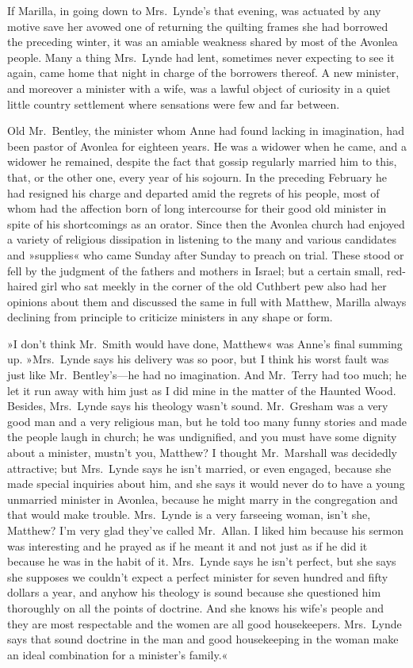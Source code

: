 If Marilla, in going down to Mrs.~Lynde's that evening, was actuated by any motive save her avowed one of returning the quilting frames she had borrowed the preceding winter, it was an amiable weakness shared by most of the Avonlea people. Many a thing Mrs.~Lynde had lent, sometimes never expecting to see it again, came home that night in charge of the borrowers thereof. A new minister, and moreover a minister with a wife, was a lawful object of curiosity in a quiet little country settlement where sensations were few and far between.

Old Mr.~Bentley, the minister whom Anne had found lacking in imagination, had been pastor of Avonlea for eighteen years. He was a widower when he came, and a widower he remained, despite the fact that gossip regularly married him to this, that, or the other one, every year of his sojourn. In the preceding February he had resigned his charge and departed amid the regrets of his people, most of whom had the affection born of long intercourse for their good old minister in spite of his shortcomings as an orator. Since then the Avonlea church had enjoyed a variety of religious dissipation in listening to the many and various candidates and »supplies« who came Sunday after Sunday to preach on trial. These stood or fell by the judgment of the fathers and mothers in Israel; but a certain small, red-haired girl who sat meekly in the corner of the old Cuthbert pew also had her opinions about them and discussed the same in full with Matthew, Marilla always declining from principle to criticize ministers in any shape or form.

»I don't think Mr.~Smith would have done, Matthew« was Anne's final summing up. »Mrs.~Lynde says his delivery was so poor, but I think his worst fault was just like Mr.~Bentley's—he had no imagination. And Mr.~Terry had too much; he let it run away with him just as I did mine in the matter of the Haunted Wood. Besides, Mrs.~Lynde says his theology wasn't sound. Mr.~Gresham was a very good man and a very religious man, but he told too many funny stories and made the people laugh in church; he was undignified, and you must have some dignity about a minister, mustn't you, Matthew? I thought Mr.~Marshall was decidedly attractive; but Mrs.~Lynde says he isn't married, or even engaged, because she made special inquiries about him, and she says it would never do to have a young unmarried minister in Avonlea, because he might marry in the congregation and that would make trouble. Mrs.~Lynde is a very farseeing woman, isn't she, Matthew? I'm very glad they've called Mr.~Allan. I liked him because his sermon was interesting and he prayed as if he meant it and not just as if he did it because he was in the habit of it. Mrs.~Lynde says he isn't perfect, but she says she supposes we couldn't expect a perfect minister for seven hundred and fifty dollars a year, and anyhow his theology is sound because she questioned him thoroughly on all the points of doctrine. And she knows his wife's people and they are most respectable and the women are all good housekeepers. Mrs.~Lynde says that sound doctrine in the man and good housekeeping in the woman make an ideal combination for a minister's family.«


